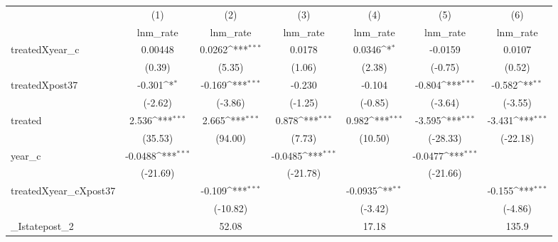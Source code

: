 {
\def\sym#1{\ifmmode^{#1}\else\(^{#1}\)\fi}
\begin{tabular}{l*{6}{c}}
\hline\hline
            &\multicolumn{1}{c}{(1)}&\multicolumn{1}{c}{(2)}&\multicolumn{1}{c}{(3)}&\multicolumn{1}{c}{(4)}&\multicolumn{1}{c}{(5)}&\multicolumn{1}{c}{(6)}\\
            &\multicolumn{1}{c}{lnm\_rate}&\multicolumn{1}{c}{lnm\_rate}&\multicolumn{1}{c}{lnm\_rate}&\multicolumn{1}{c}{lnm\_rate}&\multicolumn{1}{c}{lnm\_rate}&\multicolumn{1}{c}{lnm\_rate}\\
\hline
treatedXyear\_c&     0.00448         &      0.0262\sym{***}&      0.0178         &      0.0346\sym{*}  &     -0.0159         &      0.0107         \\
            &      (0.39)         &      (5.35)         &      (1.06)         &      (2.38)         &     (-0.75)         &      (0.52)         \\
[1em]
treatedXpost37&      -0.301\sym{*}  &      -0.169\sym{***}&      -0.230         &      -0.104         &      -0.804\sym{***}&      -0.582\sym{**} \\
            &     (-2.62)         &     (-3.86)         &     (-1.25)         &     (-0.85)         &     (-3.64)         &     (-3.55)         \\
[1em]
treated     &       2.536\sym{***}&       2.665\sym{***}&       0.878\sym{***}&       0.982\sym{***}&      -3.595\sym{***}&      -3.431\sym{***}\\
            &     (35.53)         &     (94.00)         &      (7.73)         &     (10.50)         &    (-28.33)         &    (-22.18)         \\
[1em]
year\_c      &     -0.0488\sym{***}&                     &     -0.0485\sym{***}&                     &     -0.0477\sym{***}&                     \\
            &    (-21.69)         &                     &    (-21.78)         &                     &    (-21.66)         &                     \\
[1em]
treatedXyear\_cXpost37&                     &      -0.109\sym{***}&                     &     -0.0935\sym{**} &                     &      -0.155\sym{***}\\
            &                     &    (-10.82)         &                     &     (-3.42)         &                     &     (-4.86)         \\
[1em]
\_Istatepost\_2&                     &       52.08         &                     &       17.18         &                     &       135.9         \\

\end{tabular}}
